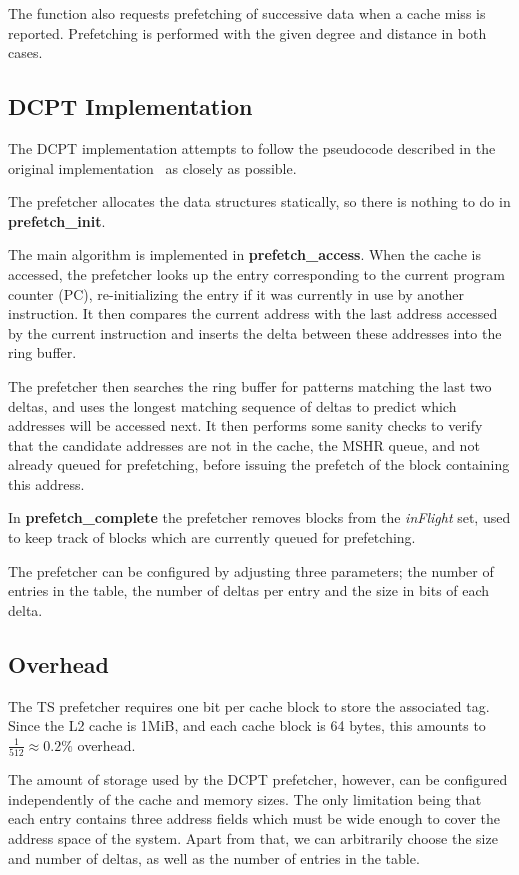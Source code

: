 The function also requests prefetching of successive data when a cache miss is
reported. Prefetching is performed with the given degree and distance in both
cases.

\subsection{DCPT Implementation}

The DCPT implementation attempts to follow the pseudocode described in the
original implementation~\cite{dcpt} as closely as possible.

The prefetcher allocates the data structures statically, so there is nothing to do in \textbf{prefetch\_init}.

The main algorithm is implemented in \textbf{prefetch\_access}. When the cache
is accessed, the prefetcher looks up the entry corresponding to the current
program counter (PC), re-initializing the entry if it was currently in use by
another instruction. It then compares the current address with the last address
accessed by the current instruction and inserts the delta between these
addresses into the ring buffer.

The prefetcher then searches the ring buffer for patterns matching the last two
deltas, and uses the longest matching sequence of deltas to predict which
addresses will be accessed next. It then performs some sanity checks to verify
that the candidate addresses are not in the cache, the MSHR queue, and not
already queued for prefetching, before issuing the prefetch of the block
containing this address.

In \textbf{prefetch\_complete} the prefetcher removes blocks from the
\emph{inFlight} set, used to keep track of blocks which are currently queued for
prefetching.

The prefetcher can be configured by adjusting three parameters; the number of
entries in the table, the number of deltas per entry and the size in bits of
each delta.

\subsection{Overhead}

The TS prefetcher requires one bit per cache block to store the associated tag.
Since the L2 cache is 1MiB, and each cache block is 64 bytes, this amounts to
$\frac{1}{512} \approx 0.2\%$ overhead.

The amount of storage used by the DCPT prefetcher, however, can be configured
independently of the cache and memory sizes. The only limitation being that each
entry contains three address fields which must be wide enough to cover the
address space of the system. Apart from that, we can arbitrarily choose the size
and number of deltas, as well as the number of entries in the table.

